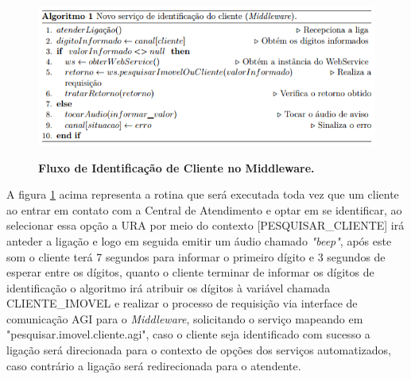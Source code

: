 

\begin{figure}[H]
	\caption{\textbf{Fluxo de Identificação de Cliente no Middleware.}}	
	\label{figura:fluxoIdentificacaoCliente}
	\includegraphics{figuras/algoritmo_1.png}
	\\[6pt]
	\fontsize{10}{12}\selectfont {Fonte: Autoria Própria.}
\end{figure}

A figura \ref{figura:fluxoIdentificacaoCliente} acima representa a rotina que será executada toda vez que um cliente ao entrar em contato com a Central de Atendimento e optar em se identificar, ao selecionar essa opção a URA por meio do contexto [PESQUISAR\_CLIENTE] irá anteder a ligação e logo em seguida emitir um áudio chamado \textit{"beep"}, após este som o cliente terá 7 segundos para informar o primeiro dígito e 3 segundos de esperar entre os dígitos, quanto o cliente terminar de informar os dígitos de identificação o algoritmo irá atribuir os dígitos à variável chamada CLIENTE\_IMOVEL e realizar o processo de requisição via interface de comunicação AGI para o \textit{Middleware}, solicitando o serviço mapeando em "pesquisar.imovel.cliente.agi", caso o cliente seja identificado com sucesso a ligação será direcionada para o contexto de opções dos serviços automatizados, caso contrário a ligação será redirecionada para o atendente.

